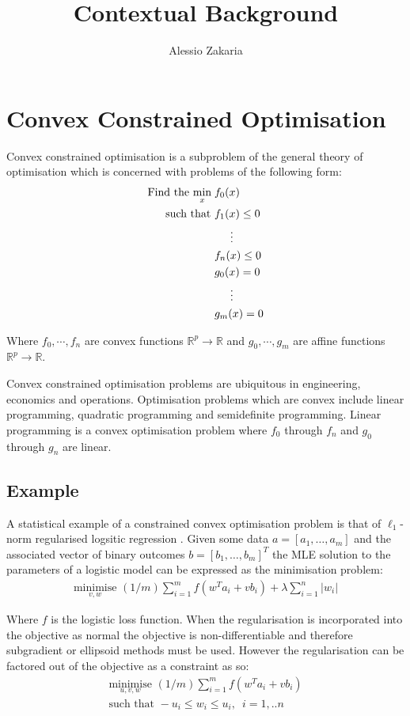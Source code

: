 \documentclass[a4paper,10pt]{article}
\date{}
\author{Alessio Zakaria}
\title{Contextual Background\vspace{-30mm}}
\def\rnum{\mathbb{R}}
\begin{document}
\maketitle
\section{Convex Constrained Optimisation}
Convex constrained optimisation is a subproblem of the general theory of
optimisation which is concerned with problems of the following form:
\begin{align*}
    \text{Find the }\underset{x}{\text{min}}\; &f_{0}(x) \\
    \text{  such that }&f_{1}(x) \leq 0 \\
    & \hspace{5mm} \vdots \\
    &f_{n}(x) \leq 0 \\
    &g_{0}(x) = 0 \\
    &\hspace{5mm} \vdots \\
    &g_{m}(x) = 0
\end{align*}

Where $f_0,\cdots, f_n$ are convex functions $\rnum^{p} \rightarrow \rnum$ and
$g_0, \cdots, g_m$ are affine functions $\rnum^{p} \rightarrow \rnum$.

Convex constrained optimisation problems are ubiquitous in engineering,
economics and operations. Optimisation problems which are convex include linear
programming, quadratic programming and semidefinite programming. Linear
programming is a convex optimisation problem where $f_{0}$ through $f_{n}$ and
$g_{0}$ through $g_{n}$ are linear.
\subsection{Example}
A statistical example of a
constrained convex optimisation problem is that of $\ell_{1}$-norm regularised
logsitic regression \cite{koh2007interior}. Given some data $a = [a_{1},\dots,a_{m}]$ and the
associated vector of binary outcomes $b = [b_{1}, \dots, b_{m}]^{T}$ the MLE
solution to the parameters of a logistic model can be expressed as the
minimisation problem:
\begin{align*}
    \underset{v, w}{\text{minimise}} \,\, (1/m)\sum_{i=1}^{m}f(w^{T}a_{i} + vb_{i})
    + \lambda\sum_{i=1}^{n}|w_{i}|
\end{align*}

Where $f$ is the logistic loss function. When the regularisation is incorporated
into the objective as normal the objective is non-differentiable and therefore
subgradient or ellipsoid methods must be used. However the regularisation can be
factored out of the objective as a constraint as so:
\begin{align*}
    \underset{u, v, w}{\text{minimise}} \,\, (1/m)\sum_{i=1}^{m}f(w^{T}a_{i} +
    vb_{i}) \\
    \text{such that } -u_{i} \leq w_{i} \leq u_{i}, \,\,\, i=1,..n
\end{align*}
\end{document}
